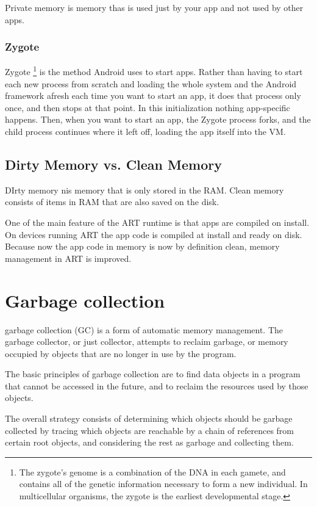 Private memory is memory thas is used just by your app and not used by other apps. 

\subsubsection{Zygote}
Zygote \footnote{The zygote's genome is a combination of the DNA in each gamete, and contains all of the genetic information necessary to form a new individual. In multicellular organisms, the zygote is the earliest developmental stage.} is the method Android uses to start apps. Rather than having to start each new process from scratch and loading the whole system and the Android framework afresh each time you want to start an app, it does that process only once, and then stops at that point. In this initialization nothing app-specific happens. Then, when you want to start an app, the Zygote process forks, and the child process continues where it left off, loading the app itself into the VM.

\subsection{Dirty Memory vs. Clean Memory}
DIrty memory nis memory that is only stored in the RAM. Clean memory consists of items in RAM that are also saved on the disk. 

One of the main feature of the ART runtime is that apps are compiled on install. On devices running ART the app code is compiled at install and ready on disk. Because now the app code in memory is now by definition clean, memory management in ART is improved.

\section{Garbage collection}
garbage collection (GC) is a form of automatic memory management. The garbage collector, or just collector, attempts to reclaim garbage, or memory occupied by objects that are no longer in use by the program. 

The basic principles of garbage collection are to find data objects in a program that cannot be accessed in the future, and to reclaim the resources used by those objects.

The overall strategy consists of determining which objects should be garbage collected by tracing which objects are reachable by a chain of references from certain root objects, and considering the rest as garbage and collecting them.

